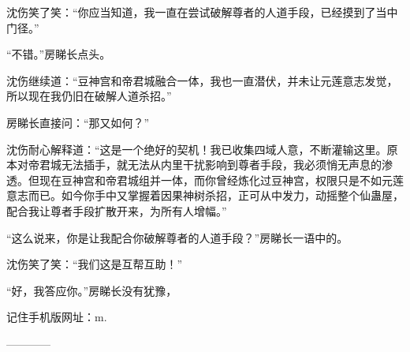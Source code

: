 \begin{this_body}
沈伤笑了笑：“你应当知道，我一直在尝试破解尊者的人道手段，已经摸到了当中门径。”

“不错。”房睇长点头。

沈伤继续道：“豆神宫和帝君城融合一体，我也一直潜伏，并未让元莲意志发觉，所以现在我仍旧在破解人道杀招。”

房睇长直接问：“那又如何？”

沈伤耐心解释道：“这是一个绝好的契机！我已收集四域人意，不断灌输这里。原本对帝君城无法插手，就无法从内里干扰影响到尊者手段，我必须悄无声息的渗透。但现在豆神宫和帝君城组并一体，而你曾经炼化过豆神宫，权限只是不如元莲意志而已。如今你手中又掌握着因果神树杀招，正可从中发力，动摇整个仙蛊屋，配合我让尊者手段扩散开来，为所有人增幅。”

“这么说来，你是让我配合你破解尊者的人道手段？”房睇长一语中的。

沈伤笑了笑：“我们这是互帮互助！”

“好，我答应你。”房睇长没有犹豫，

记住手机版网址：m.

------------

\end{this_body}


